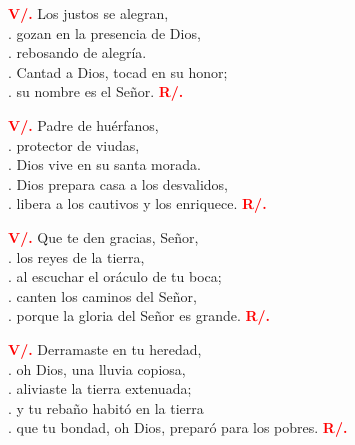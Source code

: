\documentclass[12pt, letterpaper]{article}
\begin{document}
    {\bfseries \textcolor{red}{V/.}} \hspace{1cm} Los justos se alegran,\\
    . \hspace{2.5cm} gozan en la presencia de Dios,\\
    . \hspace{2.5cm} rebosando de alegría.\\
    . \hspace{2.5cm} Cantad a Dios, tocad en su honor;\\
    . \hspace{2.5cm} su nombre es el Señor.
    \hspace{1cm} {\bfseries \textcolor{red}{R/.}}

    {\bfseries \textcolor{red}{V/.}} \hspace{1cm} Padre de huérfanos,\\
    . \hspace{2.5cm} protector de viudas,\\
    . \hspace{2.5cm} Dios vive en su santa morada.\\
    . \hspace{2.5cm} Dios prepara casa a los desvalidos,\\
    . \hspace{2.5cm} libera a los cautivos y los enriquece.
    \hspace{1cm} {\bfseries \textcolor{red}{R/.}}

    {\bfseries \textcolor{red}{V/.}} \hspace{1cm} Que te den gracias, Se\~nor,\\
    . \hspace{2.5cm} los reyes de la tierra,\\
    . \hspace{2.5cm} al escuchar el or\'aculo de tu boca;\\
    . \hspace{2.5cm} canten los caminos del Se\~nor,\\
    . \hspace{2.5cm} porque la gloria del Se\~nor es grande.
    \hspace{1cm} {\bfseries \textcolor{red}{R/.}}

    {\bfseries \textcolor{red}{V/.}} \hspace{1cm} Derramaste en tu heredad,\\
    . \hspace{2.5cm} oh Dios, una lluvia copiosa,\\
    . \hspace{2.5cm} aliviaste la tierra extenuada;\\
    . \hspace{2.5cm} y tu rebaño habitó en la tierra\\
    . \hspace{2.5cm} que tu bondad, oh Dios, preparó para los pobres.
    \hspace{1cm} {\bfseries \textcolor{red}{R/.}}
\end{document}

